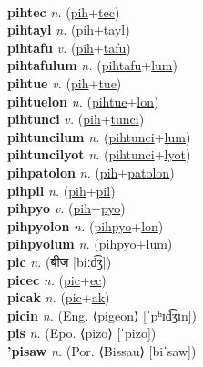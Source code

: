  \label{pihcwepucolon} \\
\textbf{pihtec} \textit{n.} (\hyperref[pih]{pih}+\hyperref[tec]{tec})
 \label{pihtec} \\
\textbf{pihtayl} \textit{n.} (\hyperref[pih]{pih}+\hyperref[tayl]{tayl})
 \label{pihtayl} \\
\textbf{pihtafu} \textit{v.} (\hyperref[pih]{pih}+\hyperref[tafu]{tafu})
 \label{pihtafu} \\
\textbf{pihtafulum} \textit{n.} (\hyperref[pihtafu]{pihtafu}+\hyperref[lum]{lum})
 \label{pihtafulum} \\
\textbf{pihtue} \textit{v.} (\hyperref[pih]{pih}+\hyperref[tue]{tue})
 \label{pihtue} \\
\textbf{pihtuelon} \textit{n.} (\hyperref[pihtue]{pihtue}+\hyperref[lon]{lon})
 \label{pihtuelon} \\
\textbf{pihtunci} \textit{v.} (\hyperref[pih]{pih}+\hyperref[tunci]{tunci})
 \label{pihtunci} \\
\textbf{pihtuncilum} \textit{n.} (\hyperref[pihtunci]{pihtunci}+\hyperref[lum]{lum})
 \label{pihtuncilum} \\
\textbf{pihtuncilyot} \textit{n.} (\hyperref[pihtunci]{pihtunci}+\hyperref[lyot]{lyot})
 \label{pihtuncilyot} \\
\textbf{pihpatolon} \textit{n.} (\hyperref[pih]{pih}+\hyperref[patolon]{patolon})
 \label{pihpatolon} \\
\textbf{pihpil} \textit{n.} (\hyperref[pih]{pih}+\hyperref[pil]{pil})
 \label{pihpil} \\
\textbf{pihpyo} \textit{v.} (\hyperref[pih]{pih}+\hyperref[pyo]{pyo})
 \label{pihpyo} \\
\textbf{pihpyolon} \textit{n.} (\hyperref[pihpyo]{pihpyo}+\hyperref[lon]{lon})
 \label{pihpyolon} \\
\textbf{pihpyolum} \textit{n.} (\hyperref[pihpyo]{pihpyo}+\hyperref[lum]{lum})
 \label{pihpyolum} \\
\textbf{pic} \textit{n.} ({\devanagari{}बीज} [biːd͡ʒ])
 \label{pic} \\
\textbf{picec} \textit{n.} (\hyperref[pic]{pic}+\hyperref[ec]{ec})
 \label{picec} \\
\textbf{picak} \textit{n.} (\hyperref[pic]{pic}+\hyperref[ak]{ak})
 \label{picak} \\
\textbf{picin} \textit{n.} (Eng. ⟨pigeon⟩ [ˈpʰɪd͡ʒɪn])
 \label{picin} \\
\textbf{pis} \textit{n.} (Epo. ⟨pizo⟩ [ˈpizo])
 \label{pis} \\
\textbf{'pisaw} \textit{n.} (Por. ⟨Bissau⟩ [biˈsaw])
